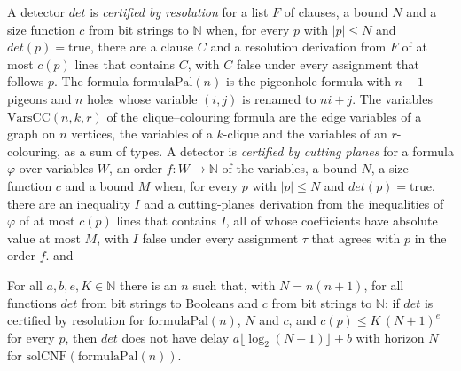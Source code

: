 \begin{definition}
  \label{def:search-certified}
  \leanok
  A detector $\mathit{det}$ is \emph{certified by resolution} for a list $F$ of clauses, a bound $N$
  and a size function $c$ from bit strings to $\mathbb{N}$ when, for every $p$ with $|p| \le N$ and
  $\mathit{det}(p) = \mathrm{true}$, there are a clause $C$ and a resolution derivation from $F$ of
  at most $c(p)$ lines that contains $C$, with $C$ false under every assignment that follows $p$.
  The formula $\mathrm{formulaPal}(n)$ is the pigeonhole formula with $n + 1$ pigeons and $n$ holes
  whose variable $(i, j)$ is renamed to $n i + j$. The variables $\mathrm{VarsCC}(n, k, r)$ of the
  clique--colouring formula are the edge variables of a graph on $n$ vertices, the variables of a
  $k$-clique and the variables of an $r$-colouring, as a sum of types. A detector is
  \emph{certified by cutting planes} for a formula $\varphi$ over variables $W$, an order $f : W \to
  \mathbb{N}$ of the variables, a bound $N$, a size function $c$ and a bound $M$ when, for every $p$
  with $|p| \le N$ and $\mathit{det}(p) = \mathrm{true}$, there are an inequality $I$ and a cutting-planes
  derivation from the inequalities of $\varphi$ of at most $c(p)$ lines that contains $I$, all of
  whose coefficients have absolute value at most $M$, with $I$ false under every assignment $\tau$
  that agrees with $p$ in the order $f$.
  \own{}
   and
\end{definition}

\begin{theorem}
  \label{thm:search-res-sin-demora-log}
  \leanok
  For all $a, b, e, K \in \mathbb{N}$ there is an $n$ such that, with $N = n(n+1)$, for all functions
  $\mathit{det}$ from bit strings to Booleans and $c$ from bit strings to $\mathbb{N}$: if
  $\mathit{det}$ is certified by resolution for $\mathrm{formulaPal}(n)$, $N$ and $c$, and
  $c(p) \le K\,(N+1)^e$ for every $p$, then $\mathit{det}$ does not have delay
  $a \lfloor \log_2 (N+1) \rfloor + b$ with horizon $N$ for $\mathrm{solCNF}(\mathrm{formulaPal}(n))$.
  \own{}
\end{theorem}

